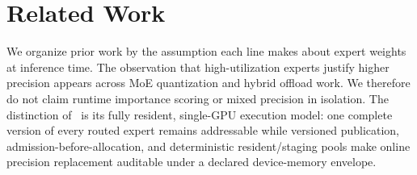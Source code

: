 \section{Related Work}

We organize prior work by the assumption each line makes about expert weights at inference time. The observation that high-utilization experts justify higher precision appears across MoE quantization and hybrid offload work. We therefore do not claim runtime importance scoring or mixed precision in isolation. The distinction of \systemname\ is its fully resident, single-GPU execution model: one complete version of every routed expert remains addressable while versioned publication, admission-before-allocation, and deterministic resident/staging pools make online precision replacement auditable under a declared device-memory envelope.

\begin{table}[!h]
\centering
\caption{Mechanism boundary relative to representative baselines. For a partial device cache, serving an expert absent from the GPU requires a host-to-device transfer, although prefetch may hide some or all of its latency.}
\label{tab:mechanism_boundary}
\vspace{-0.4em}
\scriptsize
\setlength{\tabcolsep}{2.2pt}
\end{table}

